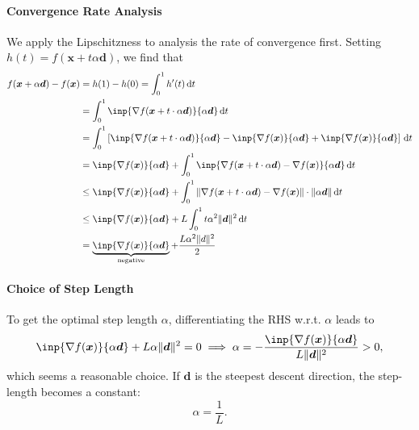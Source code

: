 \paragraph{Convergence Rate Analysis}
We apply the Lipschitzness to analysis the rate of convergence first. Setting $h(t) = f(\bm x+t\alpha\bm d)$, we find that
\begin{align*}
f(\bm x+\alpha\bm d) - f(\bm x)&=h(1) - h(0)=
\int_0^1
h'(t)\diff t\\
&=
\int_0^1
\inp{\nabla f(\bm x+t\cdot\alpha\bm d)}{\alpha \bm d}\diff t\\
&=
\int_0^1\left[
\inp{\nabla f(\bm x+t\cdot\alpha\bm d)}{\alpha \bm d}
-
\inp{\nabla f(\bm x)}{\alpha\bm d}
+
\inp{\nabla f(\bm x)}{\alpha\bm d}
\right]\diff t\\
&=\inp{\nabla f(\bm x)}{\alpha\bm d}+\int_0^1
\inp{\nabla f(\bm x+t\cdot\alpha\bm d) - \nabla f(\bm x)}{\alpha \bm d}
\diff t\\
&\le
\inp{\nabla f(\bm x)}{\alpha\bm d}
+
\int_0^1\|\nabla f(\bm x+t\cdot \alpha\bm d) - \nabla f(\bm x)\|\cdot\|\alpha\bm d\|\diff t\\
&\le \inp{\nabla f(\bm x)}{\alpha\bm d}
+L\int_0^1t\alpha^2\|\bm d\|^2\diff t\\
&=\underbrace{\inp{\nabla f(\bm x)}{\alpha\bm d}}_{\text{negative}}+\frac{L\alpha^2\| d\|^2}{2}
\end{align*}

\paragraph{Choice of Step Length}
To get the optimal step length $\alpha$, differentiating the RHS w.r.t. $\alpha$ leads to
\[
\inp{\nabla f(\bm x)}{\alpha\bm d}+L\alpha\|\bm d\|^2=0\implies
\alpha=-\frac{\inp{\nabla f(\bm x)}{\alpha\bm d}}{L\|\bm d\|^2}>0,
\]
which seems a reasonable choice. If $\bm d$ is the steepest descent direction, the step-length becomes a constant:
\[
\alpha=\frac{1}{L}.
\]












